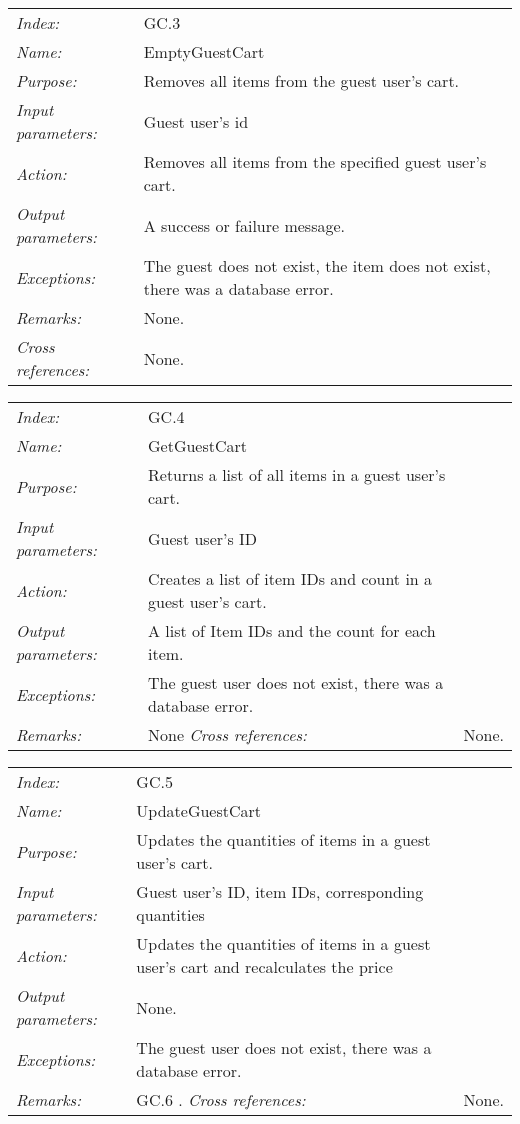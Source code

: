 \documentclass[10pt,letter]{article}
\begin{document}
\begin{tabularx}{\textwidth}{l X}
    \it{Index:} & GC.3 \\
    \it{Name:} & EmptyGuestCart \\
    \it{Purpose:} & Removes all items from the guest user's cart. \\
    \it{Input parameters:} & Guest user's id \\
    \it{Action:} & Removes all items from the specified guest user's cart. \\
    \it{Output parameters:} & A success or failure message. \\
    \it{Exceptions:} & The guest does not exist, the item does not exist, there was a database error. \\
    \it{Remarks:} & None. \\
    \it{Cross references:} & None. \\
    \hline
\end{tabularx}

\begin{tabularx}{\textwidth}{l X}
    \it{Index:} & GC.4 \\
    \it{Name:} & GetGuestCart \\
    \it{Purpose:} & Returns a list of all items in a guest user's cart. \\
    \it{Input parameters:} & Guest user's ID \\
    \it{Action:} & Creates a list of item IDs and count in a guest user's cart. \\
    \it{Output parameters:} & A list of Item IDs and the count for each item. \\
    \it{Exceptions:} & The guest user does not exist, there was a database error. \\
    \it{Remarks:} & None 
    \it{Cross references:} & None. \\
    \hline
\end{tabularx}

\begin{tabularx}{\textwidth}{l X}
    \it{Index:} & GC.5 \\
    \it{Name:} & UpdateGuestCart \\
    \it{Purpose:} & Updates the quantities of items in a guest user's cart. \\
    \it{Input parameters:} & Guest user's ID, item IDs, corresponding quantities\\
    \it{Action:} & Updates the quantities of items in a guest user's cart and recalculates the price \\
    \it{Output parameters:} & None. \\
    \it{Exceptions:} & The guest user does not exist, there was a database error. \\
    \it{Remarks:} & GC.6 .
    \it{Cross references:} & None. \\
    \hline
\end{tabularx}
\end{document}
